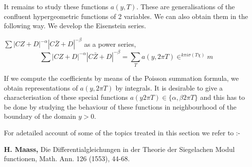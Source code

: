 It remains to study these functions $a(y, T)$. These are
generalisations of the confluent hypergeometric functions of 2
variables. We can also obtain them in the following way.  We develop
the Eisenstein series. 

\noindent
$\sum |C Z + D|^{-\alpha} |C \bar{Z} + D|^{- \beta}$ as a power
series, 
$$
\sum |C Z + D|^{-\alpha} |C \bar{Z} + D|^{- \beta} = \sum_T a (y,
2 \pi T) \in^{k \pi i \sigma (T \chi)} m
$$

If we compute the coefficients by means of the Poisson summation
formula, we obtain representations of $a(y, 2 \pi T)$ by
integrals. It is desirable to give a characterisation of these special
functions $a (y 2 \pi T) \in \{\alpha, \beta 2 \pi T \}$ and this
has to be done by studying the behaviour of these functions in
neighbourhood of the boundary of the domain $y > 0$. 

For a\pageoriginale detailed account of some of the topics treated in
this section we refer to :-  

\medskip
\noindent
 \textbf{H. Maass,} Die Differentialgleichungen in der Theorie der
 Siegelachen Modul functionen, Math. Ann. 126 (1553), 44-68. 

